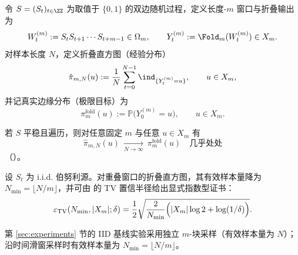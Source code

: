 \begin{definition}[一般源与折叠输出过程]\label{def:source-and-fold-output}
令 $S=(S_t)_{t\in\ZZ}$ 为取值于 $\{0,1\}$ 的双边随机过程，定义长度-$m$ 窗口与折叠输出为
\[
W_t^{(m)}:=S_tS_{t+1}\cdots S_{t+m-1}\in\Omega_m,
\qquad
Y_t^{(m)}:=\Fold_m(W_t^{(m)})\in X_m.
\]
对样本长度 $N$，定义折叠直方图（经验分布）
\[
\hat{\pi}_{m,N}(u):=\frac{1}{N}\sum_{t=0}^{N-1}\ind_{\{Y_t^{(m)}=u\}},
\qquad u\in X_m,
\]
并记真实边缘分布（极限目标）为
\[
\pi_m^{\mathrm{fold}}(u):=\mathbb{P}\bigl(Y_0^{(m)}=u\bigr),\qquad u\in X_m.
\]
\end{definition}

若 $S$ 平稳且遍历，则对任意固定 $m$ 与任意 $u\in X_m$ 有
\[
\hat{\pi}_{m,N}(u)\ \xrightarrow[N\to\infty]{}\ \pi_m^{\mathrm{fold}}(u)
\quad\text{几乎处处}
\]
（\cite{WaltersErgodicTheory}）。

设 $S_t$ 为 i.i.d. 伯努利源。对重叠窗口的折叠直方图，其有效样本量降为 $N_{\min}=\lfloor N/m\rfloor$，并可由 \cite{WeissmanEtAl2003L1Empirical} 的 TV 置信半径给出显式指数型证书：
\[
\varepsilon_{\mathrm{TV}}(N_{\min},|X_m|;\delta)=\frac12\sqrt{\frac{2}{N_{\min}}\Bigl(|X_m|\log 2+\log(1/\delta)\Bigr)}.
\]

\begin{remark}\label{rem:iid-overlap-vs-blocks}
第 \ref{sec:experiments} 节的 IID 基线实验采用独立 $m$-块采样（有效样本量为 $N$）；沿时间滑窗采样时有效样本量为 $N_{\min}=\lfloor N/m\rfloor$。
\end{remark}



